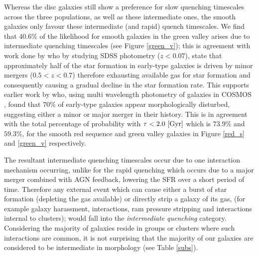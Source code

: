 \documentclass[useAMS,usenatbib]{mn2e}
\def\changed    {\color{titlecol} }
\begin{document}
Whereas the disc galaxies still show a preference for slow quenching timescales across the three populations, as well as these intermediate ones, the smooth galaxies only favour these intermediate (and rapid) quench timescales. {\changed We find that $40.6\%$ of the likelihood for smooth galaxies in the green valley arises due to intermediate quenching timescales (see Figure \ref{green_v}); this is agreement with work done by \citet{Kav14} who by studying SDSS photometry ($z<0.07$), state that approximately half of the star formation in early-type galaxies is driven by minor mergers ($0.5 < z < 0.7$) therefore exhausting available gas for star formation and consequently causing a gradual decline in the star formation rate}. This supports earlier work by \cite{Kav11} who, using multi wavelength photometry of galaxies in COSMOS \citep{Scoville07}, found that $70\%$ of early-type galaxies  appear morphologically disturbed, suggesting either a minor or major merger in their history. {\changed This is in agreement with the total percentage of probability with $\tau < 2.0 ~\rm[Gyr]$ which is $73.9\%$ and $59.3\%$, for the smooth red sequence and green valley galaxies in Figure \ref{red_s} and \ref{green_v} respectively.}

The resultant intermediate quenching timescales occur due to one interaction mechanism occurring, unlike for the rapid quenching which occurs due to a major merger combined with AGN feedback, lowering the SFR over a short period of time. Therefore any external event which can cause either a burst of star formation (depleting the gas available) or directly strip a galaxy of its gas, (for example galaxy harassment, interactions, ram pressure stripping and interactions internal to clusters); would fall into the \emph{intermediate quenching} category. Considering the majority of galaxies reside in groups or clusters where such interactions are common, it is not surprising that the majority of our galaxies are considered to be intermediate in morphology (see Table \ref{subs}).
\end{document}
